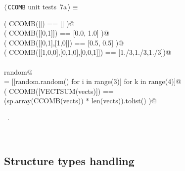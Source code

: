 \documentclass[11pt,oneside]{article}	%
\begin{document}
\begin{flushleft} \small
\begin{minipage}{\linewidth} \label{scrap21}
\protect{}$\langle\,$\texttt{CCOMB} unit tests\nobreak\ {\footnotesize 7a}$\,\rangle\equiv$
\vspace{-1ex}
\begin{list}{}{} \item
\mbox{}\verb@assert( CCOMB([]) == [] )@\\
\mbox{}\verb@assert( CCOMB([[0,1]]) == [0.0, 1.0] )@\\
\mbox{}\verb@assert( CCOMB([[0,1],[1,0]]) == [0.5, 0.5] )@\\
\mbox{}\verb@assert( CCOMB([[1,0,0],[0,1,0],[0,0,1]]) == [1./3,1./3,1./3])@\\
\mbox{}\verb@@\\
\mbox{}\verb@import random@\\
\mbox{}\verb@vects = [[random.random() for i in range(3)] for k in range(4)]@\\
\mbox{}\verb@assert( CCOMB([VECTSUM(vects)]) == \@\\
\mbox{}\verb@        (sp.array(CCOMB(vects)) * len(vects)).tolist() )@\\
\mbox{}\verb@@{\NWsep}
\end{list}
\vspace{-1ex}
\footnotesize\addtolength{\baselineskip}{-1ex}
\begin{list}{}{\setlength{\itemsep}{-\parsep}\setlength{\itemindent}{-\leftmargin}}
\item \NWtxtMacroRefIn\ .
\end{list}
\end{minipage}\\[4ex]
\end{flushleft}





\subsection{Structure types handling}
\end{document}
